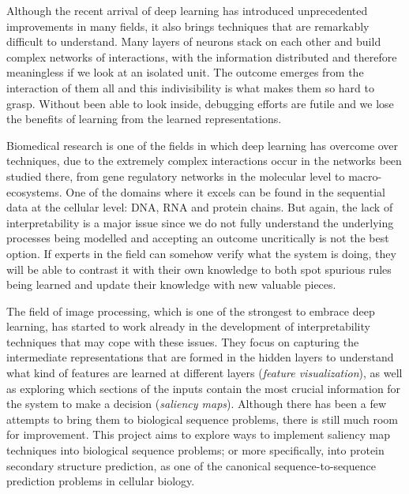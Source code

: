 Although the recent arrival of deep learning has introduced unprecedented improvements in many fields, it also brings techniques that are remarkably difficult to understand. Many layers of neurons stack on each other and build complex networks of interactions, with the information distributed and therefore meaningless if we look at an isolated unit. The outcome emerges from the interaction of them all and this indivisibility is what makes them so hard to grasp. Without been able to look inside, debugging efforts are futile and we lose the benefits of learning from the learned representations.

Biomedical research is one of the fields in which deep learning has overcome over techniques, due to the extremely complex interactions occur in the networks been studied there, from gene regulatory networks in the molecular level to macro-ecosystems. One of the domains where it excels can be found in the sequential data at the cellular level: DNA, RNA and protein chains. But again, the lack of interpretability is a major issue since we do not fully understand the underlying processes being modelled and accepting an outcome uncritically is not the best option. If experts in the field can somehow verify what the system is doing, they will be able to contrast it with their own knowledge to both spot spurious rules being learned and update their knowledge with new valuable pieces.

The field of image processing, which is one of the strongest to embrace deep learning, has started to work already in the development of interpretability techniques that may cope with these issues. They focus on capturing the intermediate representations that are formed in the hidden layers to understand what kind of features are learned at different layers (\textit{feature visualization}), as well as exploring which sections of the inputs contain the most crucial information for the system to make a decision (\textit{saliency maps}). Although there has been a few attempts to bring them to biological sequence problems, there is still much room for improvement. This project aims to explore ways to implement saliency map techniques into biological sequence problems; or more specifically, into protein secondary structure prediction, as one of the canonical sequence-to-sequence prediction problems in cellular biology.
